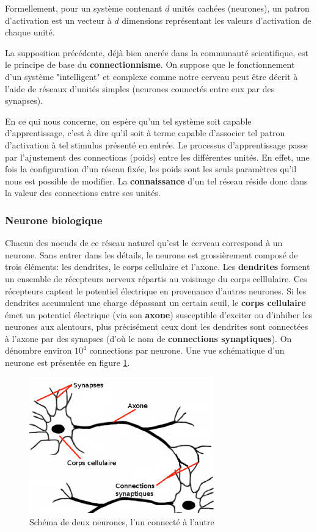 Formellement, pour un système contenant $d$ unités cachées (neurones), un
patron d'activation est un vecteur à $d$ dimensions représentant les valeurs
d'activation de chaque unité. 

La supposition précédente, déjà bien ancrée dans la communauté scientifique,
est le principe de base du \textbf{connectionnisme}. On suppose que le
fonctionnement d'un système "intelligent" et complexe comme notre cerveau peut
être décrit à l'aide de réseaux d'unités simples (neurones connectés entre eux
par des synapses).

En ce qui nous concerne, on espère qu'un tel système soit capable
d'apprentissage, c'est à dire qu'il soit à terme capable d'associer tel patron
d'activation à tel stimulus présenté en entrée. Le processus d'apprentissage
passe par l'ajustement des connections (poids) entre les différentes unités. En
effet, une fois la configuration d'un réseau fixée, les poids sont les seuls
paramètres qu'il nous est possible de modifier. La \textbf{connaissance} d'un
tel réseau réside donc dans la valeur des connections entre ses unités.

\subsubsection{Neurone biologique}

Chacun des noeuds de ce réseau naturel qu'est le cerveau correspond à un
neurone. Sans entrer dans les détails, le neurone est grossièrement composé de
trois éléments: les dendrites, le corps cellulaire et l'axone. Les
\textbf{dendrites} forment un ensemble de récepteurs nerveux répartis au
voisinage du corps celllulaire. Ces récepteurs captent le potentiel électrique
en provenance d'autres neurones. Si les dendrites accumulent une charge
dépassant un certain seuil, le \textbf{corps cellulaire} émet un potentiel
électrique (via son \textbf{axone}) susceptible d'exciter ou d'inhiber les
neurones aux alentours, plus précisément ceux dont les dendrites sont
connectées à l'axone par des synapses (d'où le nom de \textbf{connections
synaptiques}). On dénombre environ $10^{4}$ connections par neurone. Une vue
schématique d'un neurone est présentée en figure  \ref{fig:neurobio}.

\begin{figure}
\begin{center}
\includegraphics[width=8cm]{predoc/images/neurone-bio.eps}
\end{center}
\caption{\label{fig:neurobio} Schéma de deux neurones, l'un connecté à l'autre}
\end{figure}

